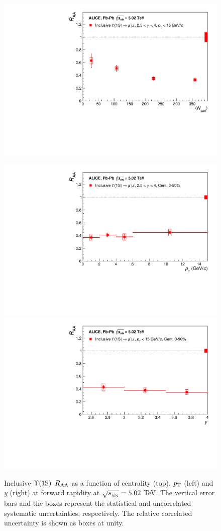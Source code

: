 \begin{figure}[!t]
\begin{center}
\includegraphics[width=0.9\linewidth]{Chapters/Analysis/Figs/RAA_Cent_ALICE2015.pdf} \\ 
\end{center}
\includegraphics[width=0.5\linewidth]{Chapters/Analysis/Figs/RAA_Pt_ALICE2015.pdf}
\includegraphics[width=0.5\linewidth]{Chapters/Analysis/Figs/RAA_Y_ALICE2015.pdf}
\caption{Inclusive $\mbox{$\Upsilon$(1S)}$ $\mbox{$R_{\rm{AA}}$}$ as a function of centrality (top), $\mbox{$p_{\rm T}$}$ (left) and $y$ (right) at forward rapidity at $\sqrt{s_{_{\rm NN}}}=5.02$ \rm{TeV}. The vertical error bars and the boxes represent the statistical and uncorrelated systematic uncertainties, respectively. The relative correlated uncertainty is shown as boxes at unity.}
\label{fig:raa_data}
\end{figure}

